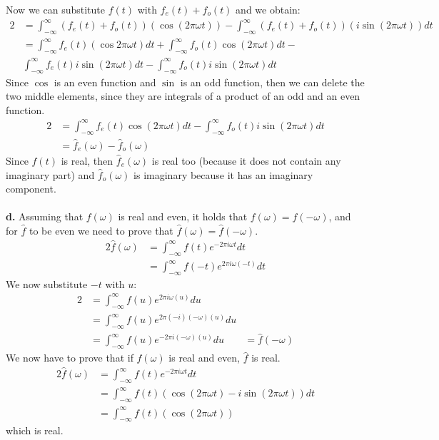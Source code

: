 \documentclass[12pt]{article}
\begin{document}
	Now we can substitute $f(t)$ with $f_e(t) + f_o(t)$ and we obtain:
	\begin{alignat*}{2}
		&=\int_{-\infty}^{\infty} (f_e(t) + f_o(t))(\cos(2\pi\omega t) ) - \int_{-\infty}^{\infty} (f_e(t) + f_o(t))(i \sin(2\pi\omega t)) dt\\
		&= \int_{-\infty}^{\infty} f_e(t)(\cos 2\pi\omega t) dt + \int_{-\infty}^{\infty} f_o(t)\cos(2\pi\omega t) dt -\\ 
		&\int_{-\infty}^{\infty} f_e(t)i \sin(2\pi\omega t) dt - \int_{-\infty}^{\infty} f_o(t)i \sin(2\pi\omega t) dt
	\end{alignat*}
	Since $\cos$ is an even function and $\sin$ is an odd function, then we can delete the two middle elements, since they are integrals of a product of an odd and an even function.
	\begin{alignat*}{2}
		&= \int_{-\infty}^{\infty} f_e(t)\cos(2\pi\omega t) dt - \int_{-\infty}^{\infty} f_o(t)i \sin(2\pi\omega t) dt\\
		&= \hat{f}_e(\omega) - \hat{f}_o(\omega)
	\end{alignat*}
	Since $f(t)$ is real, then $\hat{f}_e(\omega)$ is real too (because it does not contain any imaginary part) and $\hat{f}_o(\omega)$ is imaginary because it has an imaginary component.\\\\
	\textbf{d.} Assuming that $f(\omega)$ is real and even, it holds that $f(\omega) = f(-\omega)$, and for $\hat{f}$ to be even we need to prove that $\hat{f}(\omega) = \hat{f}(-\omega)$.
	\begin{alignat*}{2}
	\hat{f}(\omega) &= \int_{-\infty}^{\infty} f(t) e^{-2\pi i \omega t} dt\\
	&= \int_{-\infty}^{\infty} f(-t) e^{2\pi i \omega (-t)} dt
	\end{alignat*}
	We now substitute $-t$ with $u$:
	\begin{alignat*}{2}
	&= \int_{-\infty}^{\infty} f(u) e^{2\pi i \omega (u)} du\\
	&= \int_{-\infty}^{\infty} f(u) e^{2\pi (-i) (-\omega) (u)} du\\
	&= \int_{-\infty}^{\infty} f(u) e^{-2\pi i (-\omega) (u)} du &= \hat{f}(-\omega)
	\end{alignat*}
	We now have to prove that if $f(\omega)$ is real and even, $\hat{f}$ is real.
	\begin{alignat*}{2}
	\hat{f}(\omega) &= \int_{-\infty}^{\infty} f(t) e^{-2\pi i \omega t} dt\\
	&= \int_{-\infty}^{\infty} f(t)(\cos(2\pi\omega t) - i \sin(2\pi\omega t)) dt\\
	&= \int_{-\infty}^{\infty} f(t)(\cos(2\pi\omega t) )
	\end{alignat*}
	which is real.
\end{document}

